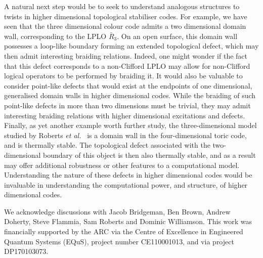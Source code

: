\documentclass[pra,twocolumn,a4paper,nofootinbib]{revtex4-1}
\begin{document}
A natural next step would be to seek to understand analogous structures to twists in higher dimensional topological stabiliser codes. For example, we have seen that the three dimensional colour code admits a two dimensional domain wall, corresponding to the LPLO $\bar{R}_3$.  On an open surface, this domain wall possesses a loop-like boundary forming an extended topological defect, which may then admit interesting braiding relations. Indeed, one might wonder if the fact that this defect corresponds to a non-Clifford LPLO may allow for non-Clifford logical operators to be performed by braiding it. It would also be valuable to consider point-like defects that would exist at the endpoints of one dimensional, generalised domain walls in higher dimensional codes. While the braiding of such point-like defects in more than two dimensions must be trivial, they may admit interesting braiding relations with higher dimensional excitations and defects.  Finally, as yet another example worth further study, the three-dimensional model studied by Roberts \textit{et al.}~\cite{Roberts} is a domain wall in the four-dimensional toric code, and is thermally stable.  The topological defect associated with the two-dimensional boundary of this object is then also thermally stable, and as a result may offer additional robustness or other features to a computational model.  Understanding the nature of these defects in higher dimensional codes would be invaluable in understanding the computational power, and structure, of higher dimensional codes.

\begin{acknowledgments}
We acknowledge discussions with Jacob Bridgeman, Ben Brown, Andrew Doherty, Steve Flammia, Sam Roberts and Dominic Williamson.  This work was financially supported by the ARC via the Centre of Excellence in Engineered Quantum Systems (EQuS), project number CE110001013, and via project DP170103073. 
\end{acknowledgments}
\end{document}
